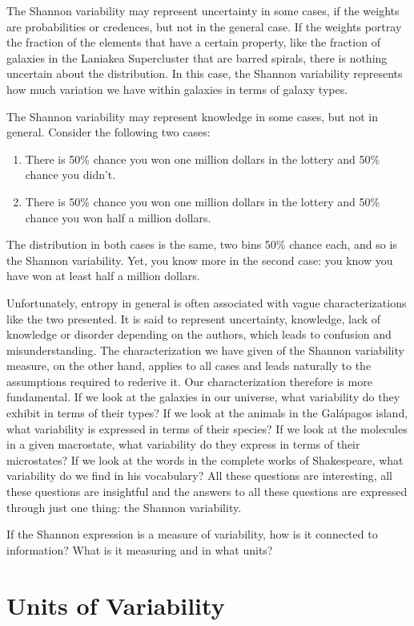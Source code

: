 \documentclass{article}
\begin{document}
The Shannon variability may represent uncertainty in some cases, if the weights are probabilities or credences, but not in the general case. If the weights portray the fraction of the elements that have a certain property, like the fraction of galaxies in the Laniakea Supercluster that are barred spirals, there is nothing uncertain about the distribution. In this case, the Shannon variability represents how much variation we have within galaxies in terms of galaxy types.

The Shannon variability may represent knowledge in some cases, but not in general. Consider the following two cases:
\begin{enumerate}
\item There is 50\% chance you won one million dollars in the lottery and 50\% chance you didn't.
\item There is 50\% chance you won one million dollars in the lottery and 50\% chance you won half a million dollars.
\end{enumerate}
The distribution in both cases is the same, two bins 50\% chance each, and so is the Shannon variability. Yet, you know more in the second case: you know you have won at least half a million dollars.

Unfortunately, entropy in general is often associated with vague characterizations like the two presented. It is said to represent uncertainty, knowledge, lack of knowledge or disorder depending on the authors, which leads to confusion and misunderstanding.  The characterization we have given of the Shannon variability measure, on the other hand, applies to all cases and leads naturally to the assumptions required to rederive it. Our characterization therefore is more fundamental. If we look at the galaxies in our universe, what variability do they exhibit in terms of their types? If we look at the animals in the Gal\'{a}pagos island, what variability is expressed in terms of their species? If we look at the molecules in a given macrostate, what variability do they express in terms of their microstates? If we look at the words in the complete works of Shakespeare, what variability do we find in his vocabulary? All these questions are interesting, all these questions are insightful and the answers to all these questions are expressed through just one thing: the Shannon variability.

If the Shannon expression is a measure of variability, how is it connected to information? What is it measuring and in what units?

\section{Units of Variability\label{uv}}
\end{document}
